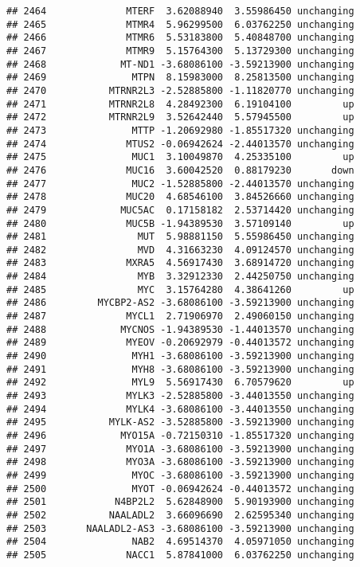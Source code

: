 \documentclass[]{article}
\begin{document}
\begin{verbatim}
## 2464              MTERF  3.62088940  3.55986450 unchanging
## 2465              MTMR4  5.96299500  6.03762250 unchanging
## 2466              MTMR6  5.53183800  5.40848700 unchanging
## 2467              MTMR9  5.15764300  5.13729300 unchanging
## 2468             MT-ND1 -3.68086100 -3.59213900 unchanging
## 2469               MTPN  8.15983000  8.25813500 unchanging
## 2470           MTRNR2L3 -2.52885800 -1.11820770 unchanging
## 2471           MTRNR2L8  4.28492300  6.19104100         up
## 2472           MTRNR2L9  3.52642440  5.57945500         up
## 2473               MTTP -1.20692980 -1.85517320 unchanging
## 2474              MTUS2 -0.06942624 -2.44013570 unchanging
## 2475               MUC1  3.10049870  4.25335100         up
## 2476              MUC16  3.60042520  0.88179230       down
## 2477               MUC2 -1.52885800 -2.44013570 unchanging
## 2478              MUC20  4.68546100  3.84526660 unchanging
## 2479             MUC5AC  0.17158182  2.53714420 unchanging
## 2480              MUC5B -1.94389530  3.57109140         up
## 2481                MUT  5.98881150  5.55986450 unchanging
## 2482                MVD  4.31663230  4.09124570 unchanging
## 2483              MXRA5  4.56917430  3.68914720 unchanging
## 2484                MYB  3.32912330  2.44250750 unchanging
## 2485                MYC  3.15764280  4.38641260         up
## 2486         MYCBP2-AS2 -3.68086100 -3.59213900 unchanging
## 2487              MYCL1  2.71906970  2.49060150 unchanging
## 2488             MYCNOS -1.94389530 -1.44013570 unchanging
## 2489              MYEOV -0.20692979 -0.44013572 unchanging
## 2490               MYH1 -3.68086100 -3.59213900 unchanging
## 2491               MYH8 -3.68086100 -3.59213900 unchanging
## 2492               MYL9  5.56917430  6.70579620         up
## 2493              MYLK3 -2.52885800 -3.44013550 unchanging
## 2494              MYLK4 -3.68086100 -3.44013550 unchanging
## 2495           MYLK-AS2 -3.52885800 -3.59213900 unchanging
## 2496             MYO15A -0.72150310 -1.85517320 unchanging
## 2497              MYO1A -3.68086100 -3.59213900 unchanging
## 2498              MYO3A -3.68086100 -3.59213900 unchanging
## 2499               MYOC -3.68086100 -3.59213900 unchanging
## 2500               MYOT -0.06942624 -0.44013572 unchanging
## 2501            N4BP2L2  5.62848900  5.90193900 unchanging
## 2502           NAALADL2  3.66096690  2.62595340 unchanging
## 2503       NAALADL2-AS3 -3.68086100 -3.59213900 unchanging
## 2504               NAB2  4.69514370  4.05971050 unchanging
## 2505              NACC1  5.87841000  6.03762250 unchanging

\end{verbatim}
\end{document}

